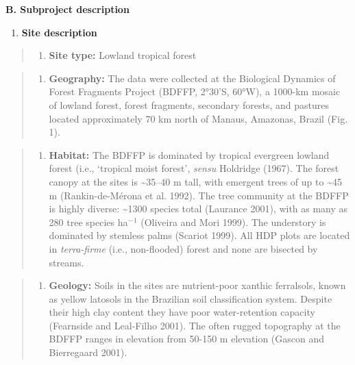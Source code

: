 \documentclass[
  12pt,
  man, donotrepeattitle,floatsintext]{apa6}
\providecommand{\tightlist}{%
  \setlength{\itemsep}{0pt}\setlength{\parskip}{0pt}}
\begin{document}
\noindent  
\textbf{B. Subproject description}

\begin{enumerate}
\def\labelenumi{\arabic{enumi}.}
\tightlist
\item
  \textbf{Site description}
\end{enumerate}

\begin{quote}
\begin{enumerate}
\def\labelenumi{\alph{enumi}.}
\tightlist
\item
  \textbf{Site type:} Lowland tropical forest
\end{enumerate}
\end{quote}

\begin{quote}
\begin{enumerate}
\def\labelenumi{\alph{enumi}.}
\setcounter{enumi}{1}
\tightlist
\item
  \textbf{Geography:} The data were collected at the Biological Dynamics of Forest Fragments Project (BDFFP, 2°30'S, 60°W), a 1000-km mosaic of lowland forest, forest fragments, secondary forests, and pastures located approximately 70 km north of Manaus, Amazonas, Brazil (Fig. 1).
\end{enumerate}
\end{quote}

\begin{quote}
\begin{enumerate}
\def\labelenumi{\alph{enumi}.}
\setcounter{enumi}{2}
\tightlist
\item
  \textbf{Habitat:} The BDFFP is dominated by tropical evergreen lowland forest (i.e., `tropical moist forest', \emph{sensu} Holdridge (1967). The forest canopy at the sites is \textasciitilde35--40 m tall, with emergent trees of up to \textasciitilde45 m (Rankin-de-Mérona et al. 1992). The tree community at the BDFFP is highly diverse: \textasciitilde1300 species total (Laurance 2001), with as many as 280 tree species ha\(^-\)\(^1\) (Oliveira and Mori 1999). The understory is dominated by stemless palms (Scariot 1999). All HDP plots are located in \emph{terra-firme} (i.e., non-flooded) forest and none are bisected by streams.
\end{enumerate}
\end{quote}

\begin{quote}
\begin{enumerate}
\def\labelenumi{\alph{enumi}.}
\setcounter{enumi}{3}
\tightlist
\item
  \textbf{Geology:} Soils in the sites are nutrient-poor xanthic ferralsols, known as yellow latosols in the Brazilian soil classification system. Despite their high clay content they have poor water-retention capacity (Fearnside and Leal-Filho 2001). The often rugged topography at the BDFFP ranges in elevation from 50-150 m elevation (Gascon and Bierregaard 2001).
\end{enumerate}
\end{quote}
\end{document}
